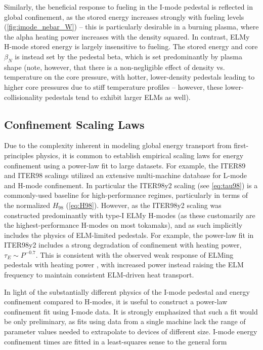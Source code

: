 Similarly, the beneficial response to fueling in the I-mode pedestal is reflected in global confinement, as the stored energy increases strongly with fueling levels (\cref{fig:imode_nebar_W}) -- this is particularly desirable in a burning plasma, where the alpha heating power increases with the density squared.    In contrast, ELMy H-mode stored energy is largely insensitive to fueling.  The stored energy and core $\beta_N$ is instead set by the pedestal beta, which is set predominantly by plasma shape (note, however, that there is a non-negligible effect of density vs. temperature on the core pressure, with hotter, lower-density pedestals leading to higher core pressures due to stiff temperature profiles -- however, these lower-collisionality pedestals tend to exhibit larger ELMs as well).

\subsection{Confinement Scaling Laws}\label{subsec:imode_powerlaws}

Due to the complexity inherent in modeling global energy transport from first-principles physics, it is common to establish empirical scaling laws for energy confinement using a power-law fit to large datasets.  For example, the ITER89 \cite{Yushmanov1990} and ITER98 \cite{ITER1999} scalings utilized an extensive multi-machine database \cite{Christiansen1992} for L-mode and H-mode confinement.  In particular the ITER98y2 scaling (see \cref{eq:tau98}) is a commonly-used baseline for high-performance regimes, particularly in terms of the normalized $H_{98}$ (\cref{eq:H98}).  However, as the ITER98y2 scaling was constructed predominantly with type-I ELMy H-modes (as these customarily are the highest-performance H-modes on most tokamaks), and as such implicitly includes the physics of ELM-limited pedestals.  For example, the power-law fit in ITER98y2 includes a strong degradation of confinement with heating power, $\tau_E \sim P^{-0.7}$.  This is consistent with the observed weak response of ELMing pedestals with heating power \cite{Snyder2007}, with increased power instead raising the ELM frequency to maintain consistent ELM-driven heat transport.

In light of the substantially different physics of the I-mode pedestal and energy confinement compared to H-modes, it is useful to construct a power-law confinement fit using I-mode data.  It is strongly emphasized that such a fit would be only preliminary, as fits using data from a single machine lack the range of parameter values needed to extrapolate to devices of different size.  I-mode energy confinement times are fitted in a least-squares sense to the general form

